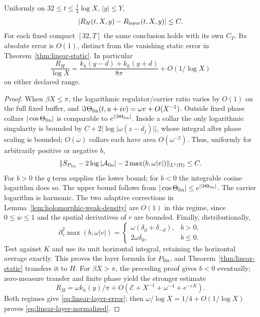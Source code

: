\begin{theorem}\label{thm:regulator-layer}
Uniformly on $32\le t\le\tfrac14\log X$, $|y|\le Y$,
\begin{equation}
 |R_H(t,X,y)-R_{\rm layer}(t,X,y)|\le C.
 \label{eq:linear-layer-error}
\end{equation}
For each fixed compact $[32,T]$ the same conclusion holds with its own
$C_T$.  Its absolute error is $O(1)$, distinct from the vanishing
static error in Theorem~\ref{thm:linear-static}.  In particular
\begin{equation}
 \frac{R_H}{\log X}=
 \frac{k_h(y-d)+k_h(y+d)}{8\pi}+O(1/\log X)
 \label{eq:linear-layer-normalized}
\end{equation}
on either declared range.
\end{theorem}
\begin{proof}
When $\beta X\le\pi$, the logarithmic regulator/carrier ratio varies
by $O(1)$ on the full fixed buffer, and
$\Im\Theta_{\rm lin}(t,u+iv)=\omega v+O(X^{-1})$.
Outside fixed phase collars $|\cos\Theta_{\rm lin}|$ is comparable
to $e^{|\Im\Theta_{\rm lin}|}$.  Inside a collar the only
logarithmic singularity is bounded by
$C+2|\log|\omega(z-d_j)||$, whose integral after phase scaling is
bounded; $O(\omega)$ collars each have area $O(\omega^{-2})$.
Thus, uniformly for arbitrarily positive or negative $b$,
\begin{equation}
 \|S_{P_{\rm lin}}-2\log|\mathcal A_{\rm lin}|
                   -2\max(b,\omega|v|)\|_{L^1(\Omega)}\le C.
 \label{eq:linear-layer-potential}
\end{equation}
For $b>0$ the $q$ term supplies the lower bound; for $b<0$ the
integrable cosine logarithm does so.  The upper bound follows from
$|\cos\Theta_{\rm lin}|\le e^{|\Im\Theta_{\rm lin}|}$.
The carrier logarithm is harmonic.  The two adaptive corrections in
Lemma~\ref{lem:holomorphic-weak-density} are $O(1)$ in this regime,
since $0\le w\le1$ and the spatial derivatives of $r$ are bounded.
Finally, distributionally,
\[
 \partial_v^2\max(b,\omega|v|)=
 \begin{cases}
 \omega(\delta_d+\delta_{-d}),&b>0,\\
 2\omega\delta_0,&b\le0.
 \end{cases}
\]
Test against $K$ and use its unit horizontal integral, retaining the
horizontal average exactly.  This proves the layer formula for
$P_{\rm lin}$, and Theorem~\ref{thm:linear-static} transfers it to $H$.
For $\beta X>\pi$, the preceding proof gives $b<0$ eventually;
zero-measure transfer and finite phase yield the stronger estimate
\[
 R_H=\omega k_h(y)/\pi
       +O(\mathcal E+X^{-1}+\omega^{-4}+e^{-cX}).
\]
Both regimes give \eqref{eq:linear-layer-error}; then
$\omega/\log X=1/4+O(1/\log X)$ proves
\eqref{eq:linear-layer-normalized}.
\end{proof}

